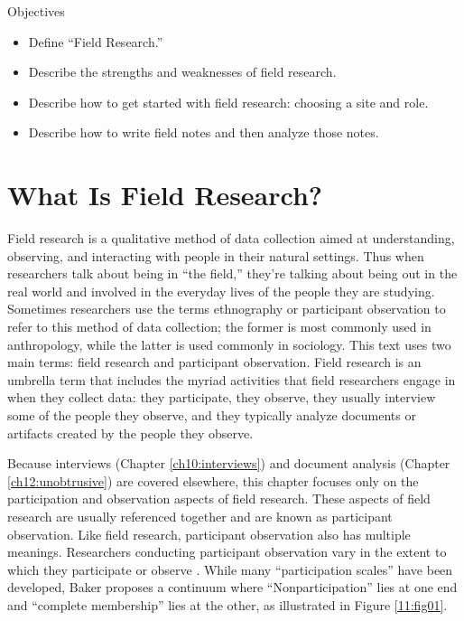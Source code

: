 \begin{center}
	\begin{objbox}{Objectives}
		\begin{itemize}
			\setlength{\itemsep}{0pt}
			\setlength{\parskip}{0pt}
			\setlength{\parsep}{0pt}
			
			\item Define ``Field Research.''
			\item Describe the strengths and weaknesses of field research.
			\item Describe how to get started with field research: choosing a site and role.
			\item Describe how to write field notes and then analyze those notes.
		\end{itemize}
	\end{objbox}
\end{center}


\section{What Is Field Research?}

Field research is a qualitative method of data collection aimed at understanding, observing, and interacting with people in their natural settings. Thus when researchers talk about being in ``the field,'' they’re talking about being out in the real world and involved in the everyday lives of the people they are studying. Sometimes researchers use the terms ethnography or participant observation to refer to this method of data collection; the former is most commonly used in anthropology, while the latter is used commonly in sociology. This text uses two main terms: field research and participant observation. Field research is an umbrella term that includes the myriad activities that field researchers engage in when they collect data: they participate, they observe, they usually interview some of the people they observe, and they typically analyze documents or artifacts created by the people they observe.

Because interviews (Chapter \ref{ch10:interviews}) and document analysis (Chapter \ref{ch12:unobtrusive}) are covered elsewhere, this chapter focuses only on the participation and observation aspects of field research. These aspects of field research are usually referenced together and are known as participant observation. Like field research, participant observation also has multiple meanings. Researchers conducting participant observation vary in the extent to which they participate or observe \cite{baker2006observation}. While many ``participation scales'' have been developed, Baker proposes a continuum where ``Nonparticipation'' lies at one end and ``complete membership'' lies at the other, as illustrated in Figure \ref{11:fig01}.

